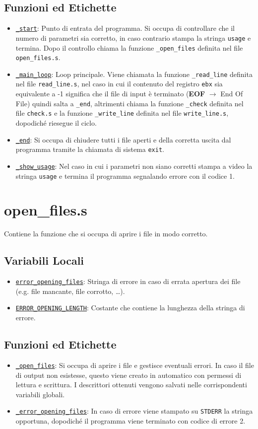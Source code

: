 \documentclass[a4paper,11pt]{article}
\newcommand{\itemtt}[1]{\item \texttt{#1}}
\begin{document}
	\subsection{Funzioni ed Etichette}
		\begin{itemize}
		\itemtt{\hyperref[e:1:1]{\_start}}: Punto di entrata del programma. Si occupa di controllare che il numero di parametri sia corretto, in caso contrario stampa la stringa \texttt{usage} e termina. Dopo il controllo chiama la funzione \texttt{\_open\_files} definita nel file \texttt{open\_files.s}. 
		\itemtt{\hyperref[e:1:2]{\_main\_loop}}: Loop principale. Viene chiamata la funzione \texttt{\_read\_line} definita nel file \texttt{read\_line.s}, nel caso in cui il contenuto del registro \texttt{ebx} sia equivalente a -1 significa che il file di input è terminato (\textbf{EOF} $\rightarrow$ End Of File) quindi salta a \texttt{\_end}, altrimenti chiama la funzione \texttt{\_check} definita nel file \texttt{check.s} e la funzione \texttt{\_write\_line} definita nel file \texttt{write\_line.s}, dopodiché riesegue il ciclo.
		\itemtt{\hyperref[e:1:3]{\_end}}: Si occupa di chiudere tutti i file aperti e della corretta uscita dal programma tramite la chiamata di sistema \texttt{exit}.
		\itemtt{\hyperref[e:1:4]{\_show\_usage}}: Nel caso in cui i parametri non siano corretti stampa a video la stringa \texttt{usage} e termina il programma segnalando errore con il codice 1.
	\end{itemize}  
	
	\section{open\_files.s}
	Contiene la funzione che si occupa di aprire i file in modo corretto.
	
	\subsection{Variabili Locali} 
	\begin{itemize}
		\itemtt{\hyperref[v:2:1]{error\_opening\_files}}: Stringa di errore in caso di errata apertura dei file (e.g. file mancante, file corrotto, \ldots).
		\itemtt{\hyperref[v:2:2]{ERROR\_OPENING\_LENGTH}}: Costante che contiene la lunghezza della stringa di errore.
	\end{itemize}
	
	\subsection{Funzioni ed Etichette}
	\begin{itemize}
		\itemtt{\hyperref[e:2:1]{\_open\_files}}: Si occupa di aprire i file e gestisce eventuali errori. In caso il file di output non esistesse, questo viene creato in automatico con permessi di lettura e scrittura. I descrittori ottenuti vengono salvati nelle corrispondenti variabili globali. 
		\itemtt{\hyperref[e:2:2]{\_error\_opening\_files}}: In caso di errore viene stampato su \texttt{STDERR} la stringa opportuna, dopodiché il programma viene terminato con codice di errore 2. 
	\end{itemize}
	
\end{document}

